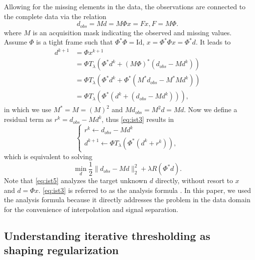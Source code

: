 Allowing for the missing elements in the data, the observations are connected to the complete data via the relation
\begin{equation}
 d_{obs}=Md=M\Phi x=Fx, F=M\Phi.
 \end{equation}
where $M$ is an acquisition mask indicating the observed and missing values. Assume $\Phi$ is a tight frame such that $\Phi^*\Phi=\mathrm{Id}$, $x=\Phi^*\Phi x=\Phi^*d$. It leads to
\begin{equation}\label{eq:ist3}
  \begin{array}{ll}
    d^{k+1} & =\Phi x^{k+1} \\
      & =\Phi T_{\lambda}(\Phi^*d^{k}+(M\Phi)^*(d_{obs}-Md^{k})) \\
      & =\Phi T_{\lambda}(\Phi^*d^{k}+\Phi^*(M^*d_{obs}-M^*Md^{k})) \\
      & =\Phi T_{\lambda}(\Phi^*(d^{k}+(d_{obs}-Md^{k}))),
  \end{array}
\end{equation}
in which we use $M^*=M=(M)^2$ and $Md_{obs}=M^2d=Md$. Now we define a residual term as $r^{k}=d_{obs}-Md^{k}$, thus \eqref{eq:ist3} results in
\begin{equation}\label{eq:ist4}
  \left\{
  \begin{array}{l}
    r^{k}\leftarrow d_{obs}-Md^{k} \\
    d^{k+1}\leftarrow \Phi T_{\lambda}(\Phi^*(d^{k}+r^{k})),
  \end{array}
  \right.
\end{equation}
which is equivalent to solving
\begin{equation}\label{eq:ist5}
  \min\limits_{d}\frac{1}{2}\|d_{obs}-Md\|_2^2+\lambda R(\Phi^{*}d).
\end{equation}
Note that \eqref{eq:ist5} analyzes the target unknown $d$ directly, without resort to $x$ and $d=\Phi x$. \eqref{eq:ist3} is referred to as the analysis formula \citep{elad2007analysis}. In this paper, we used the analysis formula because it directly addresses the problem in the data domain for the convenience of interpolation and signal separation.


\subsection{Understanding iterative thresholding as shaping regularization}

